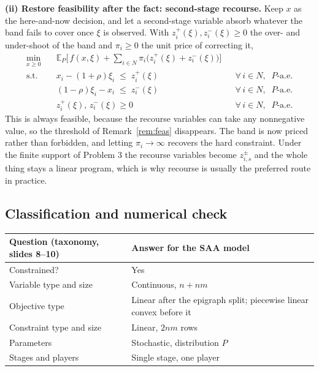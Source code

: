 \documentclass[11pt]{article}
\DeclareMathOperator*{\minimize}{min}
\theoremstyle{definition}
\begin{document}
\textbf{(ii) Restore feasibility after the fact: second-stage recourse.}
Keep $x$ as the here-and-now decision, and let a second-stage variable
absorb whatever the band fails to cover once $\xi$ is observed. With
$z^{+}_i(\xi), z^{-}_i(\xi) \ge 0$ the over- and under-shoot of the band
and $\pi_i \ge 0$ the unit price of correcting it,
\begin{align}
  \minimize_{x \ge 0} \quad
    & \mathbb{E}_P\Big[\, f(x,\xi)
      + \sum_{i \in N} \pi_i\big( z^{+}_i(\xi) + z^{-}_i(\xi) \big) \Big] \\
  \text{s.t.}\quad
    & x_i - (1+\rho)\xi_i \;\le\; z^{+}_i(\xi)
      && \forall\, i \in N, \;\; P\text{-a.e.} \\
    & (1-\rho)\xi_i - x_i \;\le\; z^{-}_i(\xi)
      && \forall\, i \in N, \;\; P\text{-a.e.} \\
    & z^{+}_i(\xi),\, z^{-}_i(\xi) \ge 0
      && \forall\, i \in N, \;\; P\text{-a.e.}
\end{align}
This is always feasible, because the recourse variables can take any
nonnegative value, so the threshold of Remark~\ref{rem:feas} disappears.
The band is now priced rather than forbidden, and letting
$\pi_i \to \infty$ recovers the hard constraint. Under the finite support
of Problem 3 the recourse variables become $z^{\pm}_{i,s}$ and the whole
thing stays a linear program, which is why recourse is usually the
preferred route in practice.

\subsection*{Classification and numerical check}

\begin{center}
\begin{tabular}{@{}ll@{}}
\toprule
Question (taxonomy, slides 8--10) & Answer for the SAA model \\
\midrule
Constrained?                & Yes \\
Variable type and size      & Continuous, $n + nm$ \\
Objective type              & Linear after the epigraph split;
                              piecewise linear convex before it \\
Constraint type and size    & Linear, $2nm$ rows \\
Parameters                  & Stochastic, distribution $P$ \\
Stages and players          & Single stage, one player \\
\bottomrule
\end{tabular}
\end{center}
\end{document}
